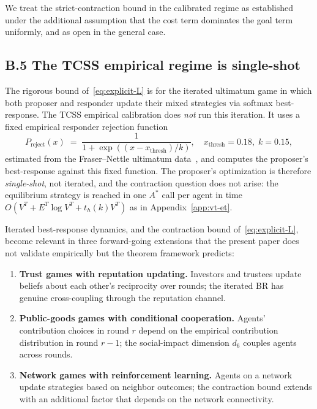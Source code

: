 \documentclass[11pt]{article}
\theoremstyle{definition}
\theoremstyle{remark}
\begin{document}
We treat the strict-contraction bound in the calibrated regime as established under the additional
assumption that the cost term dominates the goal term uniformly, and as open in the general case.

\subsection*{B.5 The TCSS empirical regime is single-shot}

The rigorous bound of~\eqref{eq:explicit-L} is for the iterated ultimatum game in which both
proposer and responder update their mixed strategies via softmax best-response. The TCSS empirical
calibration does \emph{not} run this iteration. It uses a fixed empirical responder rejection
function
\begin{equation}
\label{eq:empirical-reject}
P_{\text{reject}}(x) \;=\; \frac{1}{1 + \exp((x - x_{\text{thresh}})/k)},
\quad x_{\text{thresh}} = 0.18,\;k = 0.15,
\end{equation}
estimated from the Fraser--Nettle ultimatum data~\cite{bond2026tcss}, and computes the proposer's
best-response against this fixed function. The proposer's optimization is therefore
\emph{single-shot}, not iterated, and the contraction question does not arise: the equilibrium
strategy is reached in one $A^*$ call per agent in time
$O(V^T + E^T \log V^T + t_h(k) V^T)$ as in Appendix~\ref{app:vt-et}.

Iterated best-response dynamics, and the contraction bound of~\eqref{eq:explicit-L}, become
relevant in three forward-going extensions that the present paper does not validate empirically but
the theorem framework predicts:

\begin{enumerate}
\item \textbf{Trust games with reputation updating.} Investors and trustees update beliefs about
each other's reciprocity over rounds; the iterated BR has genuine cross-coupling through the
reputation channel.
\item \textbf{Public-goods games with conditional cooperation.} Agents' contribution choices in
round $r$ depend on the empirical contribution distribution in round $r-1$; the social-impact
dimension $d_6$ couples agents across rounds.
\item \textbf{Network games with reinforcement learning.} Agents on a network update strategies
based on neighbor outcomes; the contraction bound extends with an additional factor that depends on
the network connectivity.
\end{enumerate}
\end{document}
